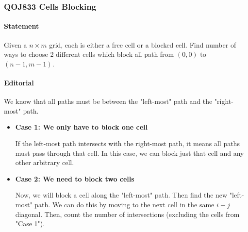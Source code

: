 \subsubsection{QOJ833 Cells Blocking}


\paragraph{Statement}
Given a $n \times m$ grid, each is either a free cell or a blocked cell.
Find number of ways to choose 2 different cells which block all path from $(0, 0)$ to $(n-1, m-1)$.

\paragraph{Editorial}
We know that all paths must be between the "left-most" path and the "right-most" path.

\begin{itemize}[leftmargin=1.5em]
    \item \textbf{Case 1: We only have to block one cell} 

    If the left-most path intersects with the right-most path, it means all paths must pass through that cell.
    In this case, we can block just that cell and any other arbitrary cell.

    \item \textbf{Case 2: We need to block two cells}
    
    Now, we will block a cell along the "left-most" path.
    Then find the new "left-most" path. We can do this by moving to the next cell in the same $i+j$ diagonal.
    Then, count the number of intersections (excluding the cells from "Case 1").
\end{itemize}


